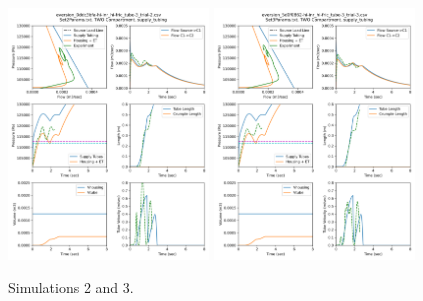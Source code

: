\documentclass[letterpaper]{article}
\begin{document}
\clearpage
\begin{figure}\centering
\includegraphics[width=0.475\textwidth]{9Files_Sim_outputs/Set2redo22-Aug.png}
\includegraphics[width=0.475\textwidth]{9Files_Sim_outputs/Set3redo22-Aug.png}
\caption{Simulations 2 and 3.}
\end{figure}
\end{document}
